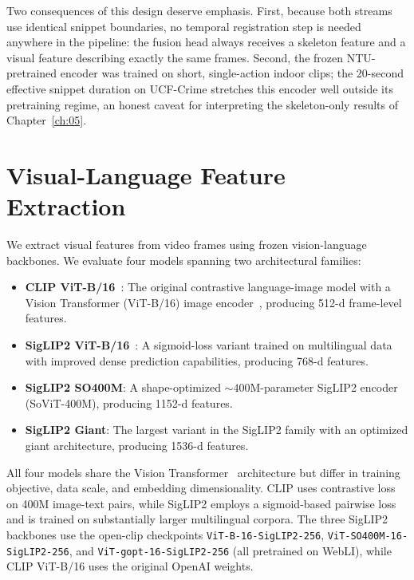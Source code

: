 Two consequences of this design deserve emphasis. First, because both streams use identical
snippet boundaries, no temporal registration step is needed anywhere in the pipeline: the fusion
head always receives a skeleton feature and a visual feature describing exactly the same frames.
Second, the frozen NTU-pretrained encoder was trained on short, single-action indoor clips; the
20-second effective snippet duration on UCF-Crime stretches this encoder well outside its
pretraining regime, an honest caveat for interpreting the skeleton-only results of
Chapter~\ref{ch:05}.

\section{Visual-Language Feature Extraction}
\label{sec:meth-vlm}

We extract visual features from video frames using frozen vision-language backbones. We evaluate
four models spanning two architectural families:
\begin{itemize}
    \item \textbf{CLIP ViT-B/16}~\cite{radford2021clip}: The original contrastive language-image
    model with a Vision Transformer (ViT-B/16) image encoder~\cite{dosovitskiy2021vit}, producing
    512-d frame-level features.
    \item \textbf{SigLIP2 ViT-B/16}~\cite{tschannen2025siglip2}: A sigmoid-loss variant trained on
    multilingual data with improved dense prediction capabilities, producing 768-d features.
    \item \textbf{SigLIP2 SO400M}: A shape-optimized ${\sim}400$M-parameter SigLIP2 encoder
    (SoViT-400M), producing 1152-d features.
    \item \textbf{SigLIP2 Giant}: The largest variant in the SigLIP2 family with an optimized
    giant architecture, producing 1536-d features.
\end{itemize}
All four models share the Vision Transformer~\cite{dosovitskiy2021vit} architecture but differ in training objective, data scale, and embedding dimensionality. CLIP uses contrastive loss on 400M image-text pairs, while SigLIP2 employs a sigmoid-based pairwise loss and is trained on substantially larger multilingual corpora. The three SigLIP2 backbones use the open-clip checkpoints \texttt{ViT-B-16-SigLIP2-256}, \texttt{ViT-SO400M-16-SigLIP2-256}, and \texttt{ViT-gopt-16-SigLIP2-256} (all pretrained on WebLI), while CLIP ViT-B/16 uses the original OpenAI weights.

